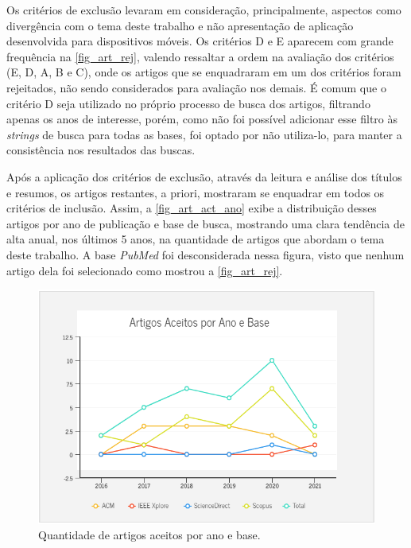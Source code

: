 Os critérios de exclusão levaram em consideração, principalmente, aspectos como divergência com o tema deste trabalho e não apresentação de aplicação desenvolvida para dispositivos móveis.
Os critérios D e E aparecem com grande frequência na \autoref{fig_art_rej}, valendo ressaltar a ordem na avaliação dos critérios (E, D, A, B e C), onde os artigos que se enquadraram em um dos critérios foram rejeitados, não sendo considerados para avaliação nos demais.
É comum que o critério D seja utilizado no próprio processo de busca dos artigos, filtrando apenas os anos de interesse, porém, como não foi possível adicionar esse filtro às \emph{strings} de busca para todas as bases, foi optado por não utiliza-lo, para manter a consistência nos resultados das buscas.

Após a aplicação dos critérios de exclusão, através da leitura e análise dos títulos e resumos, os artigos restantes, a priori, mostraram se enquadrar em todos os critérios de inclusão.
Assim, a \autoref{fig_art_act_ano} exibe a distribuição desses artigos por ano de publicação e base de busca, mostrando uma clara tendência de alta anual, nos últimos 5 anos, na quantidade de artigos que abordam o tema deste trabalho.
A base \emph{PubMed} foi desconsiderada nessa figura, visto que nenhum artigo dela foi selecionado como mostrou a \autoref{fig_art_rej}.


\begin{figure}[htb]
	\caption{\label{fig_art_act_ano}Quantidade de artigos aceitos por ano e base.}
	\begin{center}
	    \includegraphics[scale=0.85]{Imagens/msl/artigos_aceitos_ano_base.png}
	\end{center}
\end{figure}

